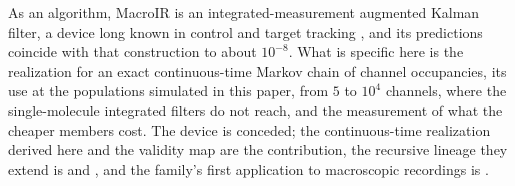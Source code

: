As an algorithm, MacroIR is an integrated-measurement augmented Kalman filter, a device long known in control and target tracking \cite{zadrozny1988gaussian}, and its predictions coincide with that construction to about $10^{-8}$. %
What is specific here is the realization for an exact continuous-time Markov chain of channel occupancies, its use at the populations simulated in this paper, from $5$ to $10^{4}$ channels, where the single-molecule integrated filters do not reach, and the measurement of what the cheaper members cost. %
The device is conceded; the continuous-time realization derived here and the validity map are the contribution, the recursive lineage they extend is \cite{moffatt2007estimation} and \cite{munch2022bayesian}, and the family's first application to macroscopic recordings is \cite{moffatt2025bayesian}.

